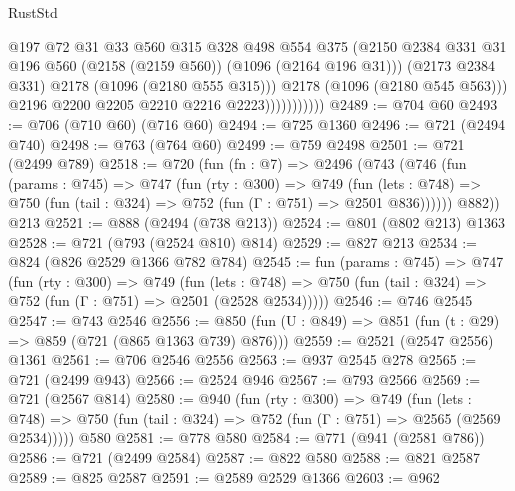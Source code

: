\begin{lexlean}{RustStd}
\begin{coremodule}
{\begin{coremodule}
{{{{{{{{{{                              @197
                              @72
                              @31
                              @33
                              @560
                              @315
                              @328
                              @498
                              @554
                              @375
                              (@2150
                                @2384
                                @331
                                @31
                                @196
                                @560
                                (@2158 (@2159 @560))
                                (@1096 (@2164 @196 @31)))
                              (@2173 @2384 @331)
                              @2178
                              (@1096 (@2180 @555 @315)))
                            @2178
                            (@1096 (@2180 @545 @563)))
                          @2196
                          @2200
                          @2205
                          @2210
                          @2216
                          @2223)))))))))))
@2489 := @704 @60
@2493 := @706 (@710 @60) (@716 @60)
@2494 := @725 @1360
@2496 := @721 (@2494 @740)
@2498 := @763 (@764 @60)
@2499 := @759 @2498
@2501 := @721 (@2499 @789)
@2518 := @720
    (fun (fn : @7) =>
    @2496
      (@743
        (@746
          (fun (params : @745) =>
          @747
            (fun (rty : @300) =>
            @749
              (fun (lets : @748) =>
              @750 (fun (tail : @324) => @752 (fun (Γ : @751) => @2501 @836))))))
        @882))
    @213
@2521 := @888 (@2494 (@738 @213))
@2524 := @801 (@802 @213) @1363
@2528 := @721 (@793 (@2524 @810) @814)
@2529 := @827 @213
@2534 := @824 (@826 @2529 @1366 @782 @784)
@2545 := fun (params : @745) =>
  @747
    (fun (rty : @300) =>
    @749
      (fun (lets : @748) =>
      @750 (fun (tail : @324) => @752 (fun (Γ : @751) => @2501 (@2528 @2534)))))
@2546 := @746 @2545
@2547 := @743 @2546
@2556 := @850 (fun (U : @849) => @851 (fun (t : @29) => @859 (@721 (@865 @1363 @739) @876)))
@2559 := @2521 (@2547 @2556) @1361
@2561 := @706 @2546 @2556
@2563 := @937 @2545 @278
@2565 := @721 (@2499 @943)
@2566 := @2524 @946
@2567 := @793 @2566
@2569 := @721 (@2567 @814)
@2580 := @940
    (fun (rty : @300) =>
    @749
      (fun (lets : @748) =>
      @750 (fun (tail : @324) => @752 (fun (Γ : @751) => @2565 (@2569 @2534)))))
    @580
@2581 := @778 @580
@2584 := @771 (@941 (@2581 @786))
@2586 := @721 (@2499 @2584)
@2587 := @822 @580
@2588 := @821 @2587
@2589 := @825 @2587
@2591 := @2589 @2529 @1366
@2603 := @962
}}}}}}}}}}
\end{coremodule}}
\end{coremodule}
\end{lexlean}
